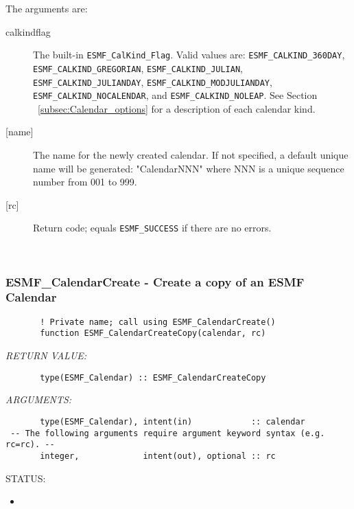        The arguments are:
       \begin{description}
       \item[calkindflag]
            The built-in {\tt ESMF\_CalKind\_Flag}.  Valid values are:
              \newline
              {\tt ESMF\_CALKIND\_360DAY}, 
              \newline
              {\tt ESMF\_CALKIND\_GREGORIAN},
              \newline
              {\tt ESMF\_CALKIND\_JULIAN}, 
              \newline
              {\tt ESMF\_CALKIND\_JULIANDAY},
              \newline
              {\tt ESMF\_CALKIND\_MODJULIANDAY}, 
              \newline
              {\tt ESMF\_CALKIND\_NOCALENDAR},
              \newline
              and {\tt ESMF\_CALKIND\_NOLEAP}.
              \newline
            See Section ~\ref{subsec:Calendar_options} for a description of each
            calendar kind.
       \item[{[name]}]
            The name for the newly created calendar.  If not specified, a
            default unique name will be generated: "CalendarNNN" where NNN
            is a unique sequence number from 001 to 999.
       \item[{[rc]}]
            Return code; equals {\tt ESMF\_SUCCESS} if there are no errors.
       \end{description}
       
 
\mbox{}\hrulefill\ 
 
\subsubsection [ESMF\_CalendarCreate] {ESMF\_CalendarCreate - Create a copy of an ESMF Calendar}


 
\begin{verbatim}       ! Private name; call using ESMF_CalendarCreate()
       function ESMF_CalendarCreateCopy(calendar, rc)
 \end{verbatim}{\em RETURN VALUE:}
\begin{verbatim}       type(ESMF_Calendar) :: ESMF_CalendarCreateCopy
 \end{verbatim}{\em ARGUMENTS:}
\begin{verbatim}       type(ESMF_Calendar), intent(in)            :: calendar
 -- The following arguments require argument keyword syntax (e.g. rc=rc). --
       integer,             intent(out), optional :: rc
 \end{verbatim}
{\sf STATUS:}
   \begin{itemize}
   \item{}
   \end{itemize}
  
